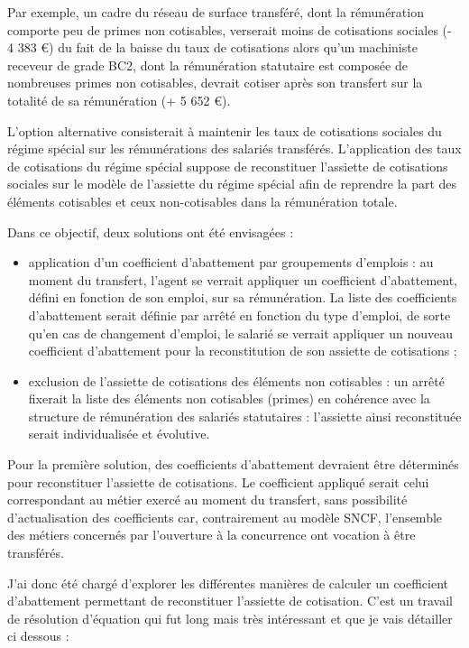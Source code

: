Par exemple, un cadre du réseau de surface transféré, dont la rémunération comporte peu de primes non cotisables, verserait moins de cotisations sociales (- 4 383 €) du fait de la baisse du taux de cotisations alors qu’un machiniste receveur de grade BC2, dont la rémunération statutaire est composée de nombreuses primes non cotisables, devrait cotiser après son transfert sur la totalité de sa rémunération (+ 5 652 €).

L’option alternative consisterait à maintenir les taux de cotisations sociales du régime spécial sur les rémunérations des salariés transférés.  L’application des taux de cotisations du régime spécial suppose de reconstituer l’assiette de cotisations sociales sur le modèle de l’assiette du régime spécial afin de reprendre la part des éléments cotisables et ceux non-cotisables dans la rémunération totale. 

Dans ce objectif, deux solutions ont été envisagées : 
\begin{itemize}
    \item application d’un coefficient d’abattement par groupements d’emplois : au moment du transfert, l’agent se verrait appliquer un coefficient d’abattement, défini en fonction de son emploi, sur sa rémunération. La liste des coefficients d’abattement serait définie par arrêté en fonction du type d’emploi, de sorte qu’en cas de changement d’emploi, le salarié se verrait appliquer un nouveau coefficient d’abattement pour la reconstitution de son assiette de cotisations ;
    \item exclusion de l’assiette de cotisations des éléments non cotisables : un arrêté fixerait la liste des éléments non cotisables (primes) en cohérence avec la structure de rémunération des salariés statutaires : l’assiette ainsi reconstituée serait individualisée et évolutive.
\end{itemize}

Pour la première solution, des coefficients d’abattement devraient être déterminés pour reconstituer l’assiette de cotisations. Le coefficient appliqué serait celui correspondant au métier exercé au moment du transfert, sans possibilité d’actualisation des coefficients car, contrairement au modèle SNCF, l’ensemble des métiers concernés par l’ouverture à la concurrence ont vocation à être transférés.

J'ai donc été chargé d'explorer les différentes manières de calculer un coefficient d'abattement permettant de reconstituer l'assiette de cotisation. C'est un travail de résolution d'équation qui fut long mais très intéressant et que je vais détailler ci dessous :


